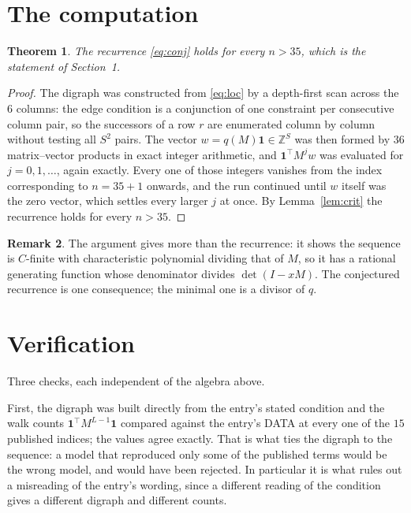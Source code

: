 \documentclass[11pt,a4paper]{article}
\theoremstyle{plain}
\newtheorem{theorem}{Theorem}
\theoremstyle{definition}
\newtheorem{remark}[theorem]{Remark}
\begin{document}
\section{The computation}

\begin{theorem}
The recurrence \eqref{eq:conj} holds for every $n>35$, which is the statement of
Section~1.
\end{theorem}

\begin{proof}
The digraph was constructed from \eqref{eq:loc} by a depth-first scan across the $6$
columns: the edge condition is a conjunction of one constraint per consecutive column
pair, so the successors of a row $r$ are enumerated column by column without testing all
$S^2$ pairs. The vector $w=q(M)\mathbf{1}\in\mathbb{Z}^{S}$ was then formed by $36$
matrix--vector products in exact integer arithmetic, and $\mathbf{1}^{\!\top}M^{j}w$ was
evaluated for $j=0,1,\dots$, again exactly. Every one of those integers vanishes from the
index corresponding to $n=35+1$ onwards, and the run continued until $w$ itself was the
zero vector, which settles every larger $j$ at once. By Lemma~\ref{lem:crit} the recurrence
holds for every $n>35$.
\end{proof}

\begin{remark}
The argument gives more than the recurrence: it shows the sequence is $C$-finite with
characteristic polynomial dividing that of $M$, so it has a rational generating function
whose denominator divides $\det(I-xM)$. The conjectured recurrence is one consequence; the
minimal one is a divisor of $q$.
\end{remark}

\section{Verification}

Three checks, each independent of the algebra above.

First, the digraph was built directly from the entry's stated condition and the walk counts
$\mathbf{1}^{\!\top}M^{L-1}\mathbf{1}$ compared against the entry's DATA at
every one of the $15$ published indices; the values agree exactly. That is what ties
the digraph to the sequence: a model that reproduced only some of the published terms would
be the wrong model, and would have been rejected. In particular it is what rules out a
misreading of the entry's wording, since a different reading of the condition gives a
different digraph and different counts.
\end{document}
